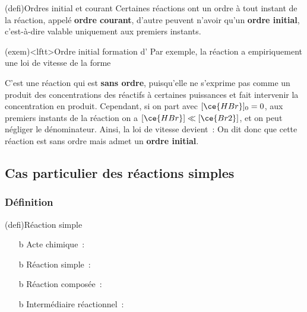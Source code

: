 \documentclass[../../main/main.tex]{subfiles}
\begin{document}
\begin{tcb}(defi){Ordres initial et courant}
	Certaines réactions ont un ordre à tout instant de la réaction, appelé
	\textbf{ordre courant}, d'autre peuvent n'avoir qu'un \textbf{ordre initial},
	c'est-à-dire valable uniquement aux premiers instants.
\end{tcb}

\begin{tcb}(exem)<lftt>{Ordre initial formation d'}
	Par exemple, la réaction
	\psw{%
		\[\ce{Br2_{\gaz} + H2_{\gaz} = 2HBr_{\gaz}}\]
	}
	a empiriquement une loi de vitesse de la forme
	\psw{%
		\[
			v = \frac{k[\ce{H2}]\times[\ce{Br2}]^{1/2}}
			{1+k' \frac{[\ce{HBr}]}{[\ce{Br2}]}}
		\]
	}

	C'est une réaction qui est \textbf{sans ordre}, puisqu'elle ne s'exprime pas
	comme un produit des concentrations des réactifs à certaines puissances et
	fait intervenir la concentration en produit.
	\smallbreak
	Cependant, si on part avec $[\ce{HBr}]_0 =
		0$, aux premiers instants de la réaction on a $[\ce{HBr}] \ll [\ce{Br2}]$,
	et on peut négliger le dénominateur. Ainsi, la loi de vitesse devient~:
	\psw{%
		\[v \Sim_{t\to 0} k [\ce{H2}][\ce{Br2}]^{1/2}\]
	}
	On dit donc que cette réaction est sans ordre mais admet un \textbf{ordre
		initial}.
\end{tcb}

\subsection{Cas particulier des réactions simples}
\subsubsection{Définition}
\begin{tcb*}[label=def:reacsimple](defi){Réaction simple}
	\begin{itemize}
		\item[b]{Acte chimique}~:
		\item[b]{Réaction simple}~:
		\item[b]{Réaction composée}~:
		\item[b]{Intermédiaire réactionnel}~:
	\end{itemize}
\end{tcb*}
\end{document}
